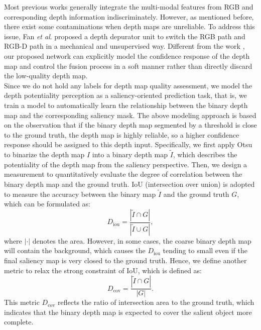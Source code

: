 \documentclass[journal]{IEEEtran}
\newcommand{\etal}{\textit{et al}.}
\begin{document}
Most previous works \cite{han2017cnns,zhu2019pdnet,chen2018progressively,zhao2019contrast,Piao_2019_ICCV} generally integrate the multi-modal features from RGB and corresponding depth information indiscriminately. However, as mentioned before, there exist some contaminations when depth maps are unreliable. To address this issue, Fan \etal \cite{fan2019D3Net} proposed a depth depurator unit to switch the RGB path and RGB-D path in a mechanical and unsupervised way. Different from the work \cite{fan2019D3Net}, our proposed network can explicitly model the confidence response of the depth map and control the fusion process in a soft manner rather than directly discard the low-quality depth map.\\
\indent Since we do not hold any labels for depth map quality assessment, we model the depth potentiality perception as a saliency-oriented prediction task, that is, we train a model to automatically learn the relationship between the binary depth map and the corresponding saliency mask. The above modeling approach is based on the observation that if the binary depth map segmented by a threshold is close to the ground truth, the depth map is highly reliable, so a higher confidence response should be assigned to this depth input. Specifically, we first apply Otsu \cite{otsu1979threshold} to binarize the depth map $I$ into a binary depth map $\tilde{I}$, which describes the potentiality of the depth map from the  saliency perspective. Then, we design a measurement to quantitatively evaluate the degree of correlation between the binary depth map and the ground truth. IoU (intersection over union) is adopted to measure the accuracy between the binary map $\tilde{I}$ and the ground truth $G$, which can be formulated as:
\begin{equation}
 D_{\mathrm{iou}} = \frac{|\tilde{I}\cap G|}{|\tilde{I}\cup G|}, \label{eq:m1}
\end{equation}
where $|\cdot|$ denotes the area.
However, in some cases, the coarse binary depth map will contain the background, which causes the $D_{\mathrm{iou}}$ tending to small even if the final saliency map is very closed to the ground truth. Hence, we define another metric to relax the strong constraint of IoU, which is defined as:
\begin{equation}
 D_{\mathrm{cov}} = \frac{|\tilde{I}\cap G|}{|G|}. \label{eq:m2}
\end{equation}
This metric $D_{\mathrm{cov}}$ reflects the ratio of intersection area to the ground truth, which indicates that the binary depth map is expected to cover the salient object more complete.
\end{document}
